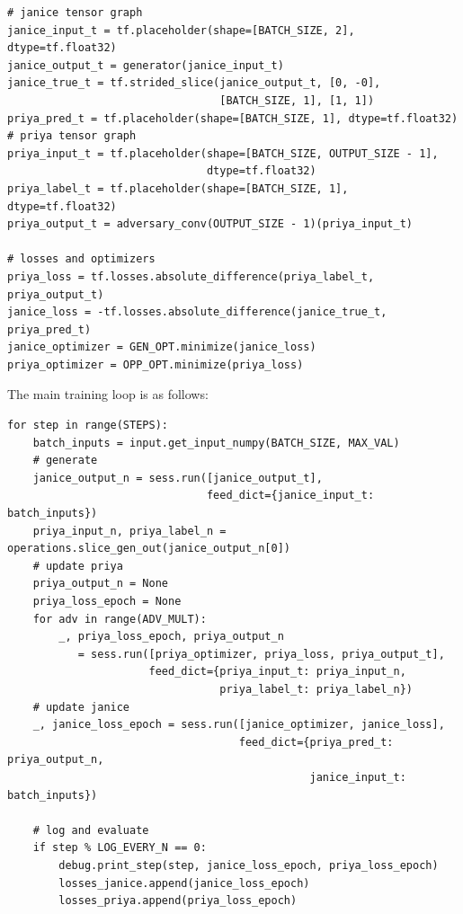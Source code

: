 \documentclass[12pt, titlepage]{report}
\theoremstyle{definition}
\begin{document}
\begin{verbatim}
# janice tensor graph
janice_input_t = tf.placeholder(shape=[BATCH_SIZE, 2], dtype=tf.float32)
janice_output_t = generator(janice_input_t)
janice_true_t = tf.strided_slice(janice_output_t, [0, -0], 
                                 [BATCH_SIZE, 1], [1, 1])
priya_pred_t = tf.placeholder(shape=[BATCH_SIZE, 1], dtype=tf.float32)
# priya tensor graph
priya_input_t = tf.placeholder(shape=[BATCH_SIZE, OUTPUT_SIZE - 1], 
                               dtype=tf.float32)
priya_label_t = tf.placeholder(shape=[BATCH_SIZE, 1], dtype=tf.float32)
priya_output_t = adversary_conv(OUTPUT_SIZE - 1)(priya_input_t)

# losses and optimizers
priya_loss = tf.losses.absolute_difference(priya_label_t, priya_output_t)
janice_loss = -tf.losses.absolute_difference(janice_true_t, priya_pred_t)
janice_optimizer = GEN_OPT.minimize(janice_loss)
priya_optimizer = OPP_OPT.minimize(priya_loss)
\end{verbatim}

The main training loop is as follows:

\begin{verbatim}
for step in range(STEPS):
    batch_inputs = input.get_input_numpy(BATCH_SIZE, MAX_VAL)
    # generate
    janice_output_n = sess.run([janice_output_t],
                               feed_dict={janice_input_t: batch_inputs})
    priya_input_n, priya_label_n = operations.slice_gen_out(janice_output_n[0])
    # update priya
    priya_output_n = None
    priya_loss_epoch = None
    for adv in range(ADV_MULT):
        _, priya_loss_epoch, priya_output_n 
           = sess.run([priya_optimizer, priya_loss, priya_output_t],
                      feed_dict={priya_input_t: priya_input_n, 
                                 priya_label_t: priya_label_n})
    # update janice
    _, janice_loss_epoch = sess.run([janice_optimizer, janice_loss],
                                    feed_dict={priya_pred_t: priya_output_n,
                                               janice_input_t: batch_inputs})

    # log and evaluate
    if step % LOG_EVERY_N == 0:
        debug.print_step(step, janice_loss_epoch, priya_loss_epoch)
        losses_janice.append(janice_loss_epoch)
        losses_priya.append(priya_loss_epoch)
\end{verbatim}



\end{document}
